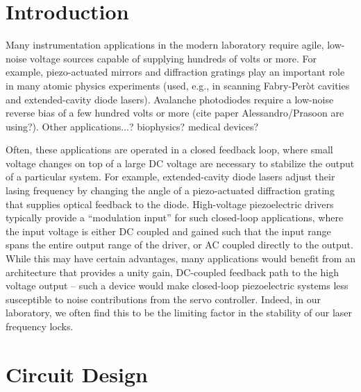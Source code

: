 \documentclass[aip,rsi,reprint]{revtex4-1} %
\begin{document}
\section{Introduction}
\label{Sec:Introduction}

Many instrumentation applications in the modern laboratory require agile, low-noise voltage sources capable of supplying hundreds of volts or more.
For example, piezo-actuated mirrors and diffraction gratings play an important role in many atomic physics experiments (used, e.g., in scanning Fabry-Per{\`o}t cavities and extended-cavity diode lasers).
Avalanche photodiodes require a low-noise reverse bias of a few hundred volts or more (cite paper Alessandro/Prasoon are using?).
Other applications...? biophysics? medical devices?

Often, these applications are operated in a closed feedback loop, where small voltage changes on top of a large DC voltage are necessary to stabilize the output of a particular system.
For example, extended-cavity diode lasers adjust their lasing frequency by changing the angle of a piezo-actuated diffraction grating that supplies optical feedback to the diode.
High-voltage piezoelectric drivers typically provide a ``modulation input'' for  such closed-loop applications, where the input voltage is either DC coupled and gained such that the input range spans the entire output range of the driver, or AC coupled directly to the output.
While this may have certain advantages, many applications would benefit from an architecture that provides a unity gain, DC-coupled feedback path to the high voltage output -- such a device would make closed-loop piezoelectric systems less susceptible to noise contributions from the servo controller.
Indeed, in our laboratory, we often find this to be the limiting factor in the stability of our laser frequency locks.




\section{Circuit Design}
\label{Sec:Circuit}
\end{document}
